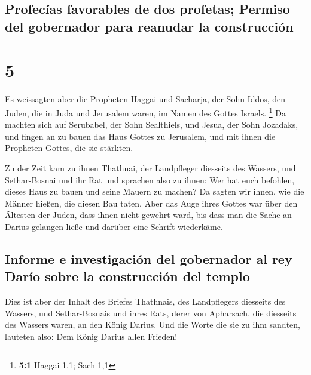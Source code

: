 \hypertarget{profecuxedas-favorables-de-dos-profetas-permiso-del-gobernador-para-reanudar-la-construcciuxf3n}{%
\subsection{Profecías favorables de dos profetas; Permiso del gobernador
para reanudar la
construcción}\label{profecuxedas-favorables-de-dos-profetas-permiso-del-gobernador-para-reanudar-la-construcciuxf3n}}

\hypertarget{section-4}{%
\section{5}\label{section-4}}

 Es weissagten aber die Propheten Haggai und Sacharja, der
Sohn Iddos, den Juden, die in Juda und Jerusalem waren, im Namen des
Gottes Israels. \footnote{\textbf{5:1} Haggai 1,1; Sach 1,1}
 Da machten sich auf Serubabel, der Sohn Sealthiels, und
Jesua, der Sohn Jozadaks, und fingen an zu bauen das Haus Gottes zu
Jerusalem, und mit ihnen die Propheten Gottes, die sie stärkten.

 Zu der Zeit kam zu ihnen Thathnai, der Landpfleger
diesseits des Wassers, und Sethar-Bosnai und ihr Rat und sprachen also
zu ihnen: Wer hat euch befohlen, dieses Haus zu bauen und seine Mauern
zu machen?  Da sagten wir ihnen, wie die Männer hießen,
die diesen Bau taten.  Aber das Auge ihres Gottes war über
den Ältesten der Juden, dass ihnen nicht gewehrt ward, bis dass man die
Sache an Darius gelangen ließe und darüber eine Schrift wiederkäme.

\hypertarget{informe-e-investigaciuxf3n-del-gobernador-al-rey-daruxedo-sobre-la-construcciuxf3n-del-templo}{%
\subsection{Informe e investigación del gobernador al rey Darío sobre la
construcción del
templo}\label{informe-e-investigaciuxf3n-del-gobernador-al-rey-daruxedo-sobre-la-construcciuxf3n-del-templo}}

 Dies ist aber der Inhalt des Briefes Thathnais, des
Landpflegers diesseits des Wassers, und Sethar-Bosnais und ihres Rats,
derer von Apharsach, die diesseits des Wassers waren, an den König
Darius.  Und die Worte die sie zu ihm sandten, lauteten
also: Dem König Darius allen Frieden!

